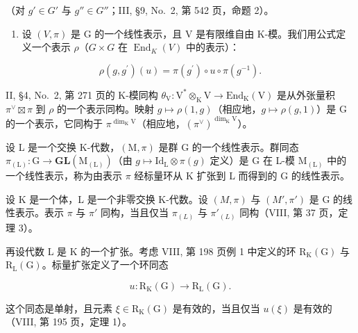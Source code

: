 （对 \(g' \in G'\) 与 \(g'' \in G''\)；III, §9, No.~2, 第 542 页，命题 2）。

\begin{enumerate}
\def\labelenumi{\arabic{enumi})}
\setcounter{enumi}{5}
\tightlist
\item
  设 \((V,\pi)\) 是 G 的一个线性表示，且 V 是有限维自由 K-模。我们用公式定义一个表示 \(\rho\)（\(G\times G\) 在 \(\operatorname{End}_{K}(V)\) 中的表示）：
\end{enumerate}

\[
\rho (g, g ^ {\prime}) (u) = \pi (g ^ {\prime}) \circ u \circ \pi (g ^ {- 1}).
\]

II, §4, No.~2, 第 271 页的 K-模同构 \(\theta_{\mathrm{V}}: \mathrm{V}^{*} \otimes_{\mathrm{K}} \mathrm{V} \to \mathrm{End}_{\mathrm{K}}(\mathrm{V})\) 是从外张量积 \(\pi^{\vee} \boxtimes \pi\) 到 \(\rho\) 的一个表示同构。映射 \(g \mapsto \rho(1, g)\)（相应地，\(g \mapsto \rho(g, 1)\)）是 G 的一个表示，它同构于 \(\pi^{\dim_{\mathrm{K}} \mathrm{V}}\)（相应地，\((\pi^{\vee})^{\dim_{\mathrm{K}} \mathrm{V}}\)）。

设 L 是一个交换 K-代数，\((\mathrm{M},\pi)\) 是群 G 的一个线性表示。群同态 \(\pi_{(\mathrm{L})}:\mathrm{G}\to\mathbf{GL}(\mathrm{M}_{(\mathrm{L})})\)（由 \(g\mapsto\mathrm{Id}_{\mathrm{L}}\otimes\pi(g)\) 定义）是 G 在 L-模 \(\mathrm{M}_{(\mathrm{L})}\) 中的一个线性表示，称为由表示 \(\pi\) 经标量环从 K 扩张到 L 而得到的 G 的线性表示。

设 K 是一个体，L 是一个非零交换 K-代数。设 \((M,\pi)\) 与 \((M',\pi')\) 是 G 的线性表示。表示 \(\pi\) 与 \(\pi'\) 同构，当且仅当 \(\pi_{(L)}\) 与 \(\pi'_{(L)}\) 同构（VIII, 第 37 页，定理 3）。

再设代数 L 是 K 的一个扩张。考虑 VIII, 第 198 页例 1 中定义的环 \(\mathrm{R}_{\mathrm{K}}(\mathrm{G})\) 与 \(\mathrm{R}_{\mathrm{L}}(\mathrm{G})\)。标量扩张定义了一个环同态

\[
u: \mathrm{R} _ {\mathrm{K}} (\mathrm{G}) \longrightarrow \mathrm{R} _ {\mathrm{L}} (\mathrm{G}).
\]

这个同态是单射，且元素 \(\xi \in \mathrm{R}_{\mathrm{K}}(\mathrm{G})\) 是有效的，当且仅当 \(u(\xi)\) 是有效的（VIII, 第 195 页，定理 1）。

